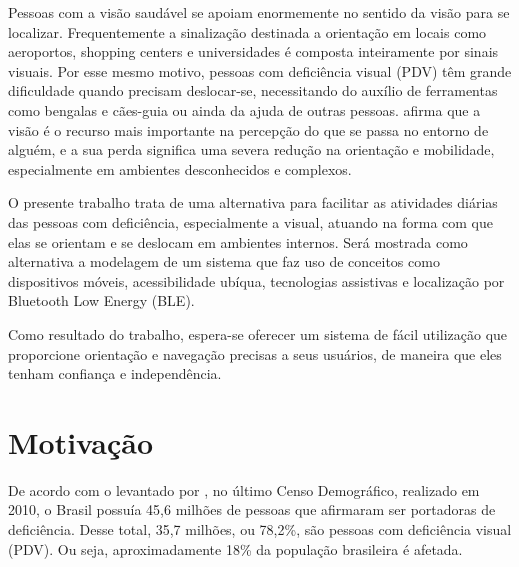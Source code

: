 \documentclass[english,brazilian]{UNISINOSmonografia}
\begin{document}

Pessoas com a visão saudável se apoiam enormemente no sentido da visão para se localizar. Frequentemente a sinalização destinada a orientação em locais como aeroportos, shopping centers e universidades é composta inteiramente por sinais visuais. Por esse mesmo motivo, pessoas com deficiência visual (PDV) têm grande dificuldade quando precisam deslocar-se, necessitando do auxílio de ferramentas como bengalas e cães-guia ou ainda da ajuda de outras pessoas.  afirma que a visão é o recurso mais importante na percepção do que se passa no entorno de alguém, e a sua perda significa uma severa redução na orientação e mobilidade, especialmente em ambientes desconhecidos e complexos.

O presente trabalho trata de uma alternativa para facilitar as atividades diárias das pessoas com deficiência, especialmente a visual, atuando na forma com que elas se orientam e se deslocam em ambientes internos. Será mostrada como alternativa a modelagem de um sistema que faz uso de conceitos como dispositivos móveis, acessibilidade ubíqua, tecnologias assistivas e localização por Bluetooth Low Energy (BLE).

Como resultado do trabalho, espera-se oferecer um sistema de fácil utilização que proporcione orientação e navegação precisas a seus usuários, de maneira que eles tenham confiança e independência. 

	\section{Motivação}


De acordo com o levantado por , no último Censo Demográfico, realizado em 2010, o Brasil possuía 45,6 milhões de pessoas que afirmaram ser portadoras de deficiência. Desse total, 35,7 milhões, ou 78,2\%, são pessoas com deficiência visual (PDV). Ou seja, aproximadamente 18\% da população brasileira é afetada.
\end{document}

